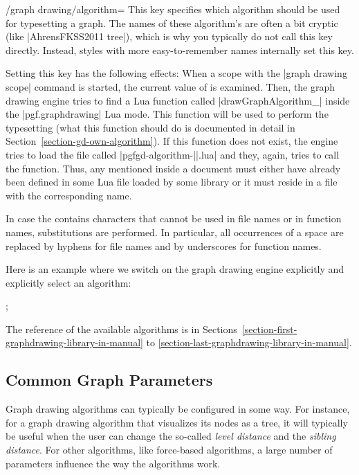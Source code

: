 \begin{key}{/graph drawing/algorithm=}
  \label{section-gd-algorithm-key}%
  This key specifies which algorithm should be used for typesetting a
  graph. The names of these algorithm's are often a bit cryptic (like
  |AhrensFKSS2011 tree|), which is why you typically do not call this
  key directly. Instead, styles with more easy-to-remember names
  internally set this key.

  Setting this key has the following effects: When a scope with the
  |graph drawing scope| command is started, the current value of
   is examined. Then, the graph drawing engine
  tries to find a Lua function called
  |drawGraphAlgorithm_| inside the
  |pgf.graphdrawing| Lua mode. This function will be used to
  perform the typesetting (what this function should do is documented
  in detail in Section~\ref{section-gd-own-algorithm}). If this
  function does not exist, the engine tries to load the file 
  called |pgfgd-algorithm-||.lua| and they,
  again, tries to call the function. Thus, any 
  mentioned inside a document must either have already been defined in
  some Lua file loaded by some library or it must reside in a file
  with the corresponding name.
  
  In case the  contains characters that cannot
  be used in file names or in function names, substitutions are
  performed. In particular, all occurrences of a space are replaced by
  hyphens for file names and by underscores for function names.

  Here is an example where we switch on the graph drawing engine
  explicitly and explicitly select an algorithm:
\begin{codeexample}[]
\tikz [graph drawing scope,
       /graph drawing/algorithm=AhrensFKSS2011 tree]
  ;  
\end{codeexample}

  The reference of the available algorithms is in
  Sections~\ref{section-first-graphdrawing-library-in-manual} to 
  \ref{section-last-graphdrawing-library-in-manual}.
\end{key}


\subsection{Common Graph Parameters}

Graph drawing algorithms can typically be configured in some way. For
instance, for a graph drawing algorithm that visualizes its nodes as a
tree, it will typically be useful when the user can change the
so-called \emph{level distance} and the \emph{sibling distance}. For
other algorithms, like force-based algorithms, a large number of
parameters influence the way the algorithms work.

